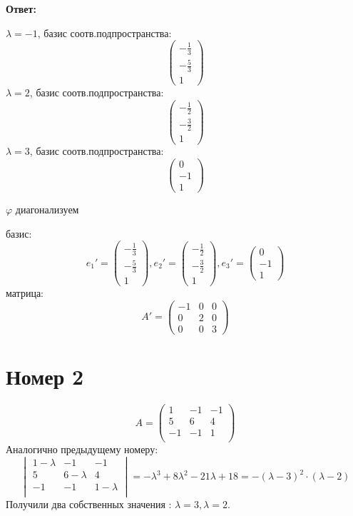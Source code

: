 \documentclass[a4paper,12pt]{article}
\begin{document}
\clearpage
\begin{center}
\textbf{Ответ: } 

$\lambda = -1$, базис соотв.подпространства:
\[
\begin{pmatrix}
-\frac13 \\-\frac53 \\ 1
\end{pmatrix}
\]
$\lambda = 2$, базис соотв.подпространства: 
\[
\begin{pmatrix}
-\frac12 \\ -\frac32 \\ 1
\end{pmatrix}
\]
$\lambda = 3$, базис соотв.подпространства:  
\[
\begin{pmatrix}
0 \\ -1 \\ 1
\end{pmatrix}
\]

$\varphi$ диагонализуем

базис:
\[
e_1' = 
\begin{pmatrix}
-\frac13 \\-\frac53 \\ 1
\end{pmatrix},
e_2' = 
\begin{pmatrix}
-\frac12 \\ -\frac32 \\ 1
\end{pmatrix},
e_3' =
\begin{pmatrix}
0 \\ -1 \\ 1
\end{pmatrix}
\]
матрица:
\[
A' = 
\left(\begin{matrix}
-1 & 0 & 0 \\
0 & 2 & 0 \\
0 & 0 & 3
\end{matrix}\right)
\]
\end{center}
\clearpage
\section*{Номер 2}
\[
A = \begin{pmatrix}
1 & -1 & -1 \\
5 & 6 & 4 \\
-1 & -1 & 1 \\
\end{pmatrix}
\]
Аналогично предыдущему номеру:
\[
\begin{vmatrix}
1 - \lambda & -1 & -1 \\
5 & 6 - \lambda  & 4 \\
-1 & -1 & 1 - \lambda \\
\end{vmatrix} = -\lambda^3 + 8 \lambda^2 - 21\lambda + 18 = -(\lambda - 3)^2 \cdot (\lambda - 2)
\]
Получили два собственных значения : $\lambda = 3, \lambda = 2$. 
\end{document}
